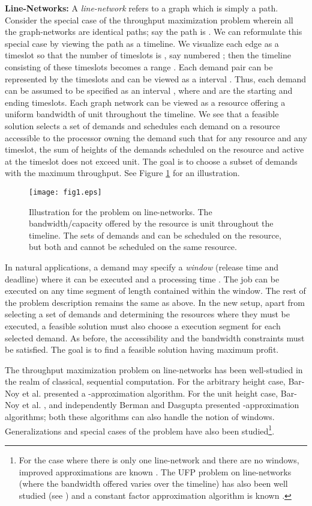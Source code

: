 \documentclass[11pt]{article}
\begin{document}
\noindent
{\bf Line-Networks:} A {\em line-network} refers to a graph which is simply a path.
Consider the special case of the throughput maximization problem
wherein all the graph-networks are identical paths; say the path is .
We can reformulate this special case by viewing the path as a timeline.
We visualize each edge  as a timeslot so that the number of timeslots
is , say numbered ; then the timeline consisting of these
timeslots becomes a range .
Each demand pair  can be represented by the timeslots 
and can be viewed as a interval . 
Thus, each demand can be assumed to be specified as an interval ,
where  and  are the starting and ending timeslots.
Each graph network can be viewed as a resource offering a uniform bandwidth of  unit
throughout the timeline. We see that a feasible solution selects a set of 
demands and schedules each demand on a resource accessible to the processor owning
the demand such that for any resource and any timeslot, 
the sum of heights of the demands scheduled on the resource and active at the timeslot
does not exceed  unit. The goal is to choose a subset of demands with the maximum throughput.
See Figure \ref{fig:1} for an illustration.

\begin{figure}
\centering
\texttt{[image: fig1.eps]}
\caption{Illustration for the problem on line-networks. 
The bandwidth/capacity offered by the resource is  unit throughout the timeline. 
The sets of demands  and  can be scheduled
on the resource, but both  and  cannot be scheduled on the same resource.
}
\label{fig:1}
\end{figure}

In natural applications, a demand may specify a {\em window} 
 (release time and deadline) where it can be executed and a processing time .
The job can be executed on any time segment of length  contained within the window.
The rest of the problem description remains the same as above.
In the new setup, apart from selecting a set of demands and determining the resources where they must be executed,
a feasible solution must also choose a execution segment for each selected demand.
As before, the accessibility and the bandwidth constraints must be satisfied.
The goal is to find a feasible solution having maximum profit.

The throughput maximization problem on line-networks 
has been well-studied in the realm of classical, sequential computation. 
For the arbitrary height case, Bar-Noy et al. \cite{Bar-Noy-Jacm} presented a -approximation algorithm.
For the unit height case, Bar-Noy et al. \cite{Bar-Noy-Jacm}, and independently Berman and Dasgupta \cite{BermanDasgupta}
presented -approximation algorithms; both these algorithms can also handle the notion of windows.
Generalizations and special cases of the problem have also been studied\footnote{
For the case where there is only one line-network and there are no windows,
improved approximations are known \cite{Bar-Noy-Jacm,Calinescu}.
The UFP problem on line-networks (where the bandwidth offered varies over the timeline)
has also been well studied (see \cite{Bansal1,Bansal2,our-ipdps,AmitKumar,ChekuriUFP})
and a constant factor approximation algorithm is known \cite{Bonsma}.
}.
\end{document}
